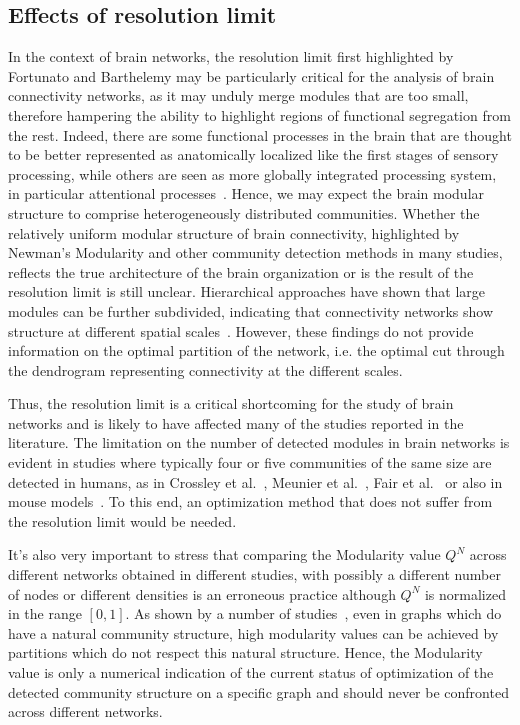 \subsection{Effects of resolution limit}
In the context of brain networks, the resolution limit first highlighted by Fortunato and Barthelemy may be particularly critical for the analysis of brain connectivity networks, as it may unduly merge modules that are too small, therefore hampering the ability to highlight regions of functional segregation from the rest. Indeed, there are some functional processes in the brain that are thought to be better represented as anatomically localized like the first stages of sensory processing, while others are seen as more globally integrated processing system, in particular attentional processes~\cite{alnaes2015}.
Hence, we may expect the brain modular structure to comprise heterogeneously distributed communities.
Whether the relatively uniform modular structure of brain connectivity, highlighted by Newman's Modularity and other community detection methods in many studies, reflects the true architecture of the brain organization or is the result of the resolution limit is still unclear.
Hierarchical approaches have shown that large modules can be further subdivided, indicating that connectivity networks show structure at different spatial scales~\cite{meunier2009}.
However, these findings do not provide information on the optimal partition of the network, i.e. the optimal cut through the dendrogram representing connectivity at the different scales.

Thus, the resolution limit is a critical shortcoming for the study of brain networks and is likely to have affected many of the studies reported in the literature. The limitation on the number of detected modules in brain networks is evident in studies where typically four or five communities of the same size are detected in humans, as in Crossley et al.~\cite{crossley2013a}, Meunier et al.~\cite{meunier2009a,meunier2010}, Fair et al.~\cite{fair2009} or also in mouse models~\cite{schwarz2008}. To this end, an optimization method that does not suffer from the resolution limit would be needed.

It's also very important to stress that comparing the Modularity value $Q^N$ across different networks obtained in different studies, with possibly a different number of nodes or different densities is an erroneous practice although $Q^N$ is normalized in the range $[0,1]$. As shown by a number of studies~\cite{good2009,kehagias2013,radicchi2010}, even in graphs which do have a natural community structure, high modularity values can be achieved by partitions which do not respect this natural structure. Hence, the Modularity value is only a numerical indication of the current status of optimization of the detected community structure on a specific graph and should never be confronted across different networks.


